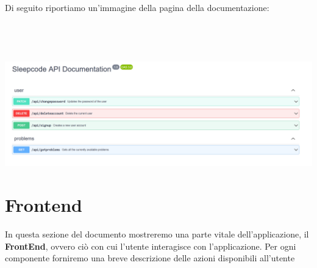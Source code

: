 \documentclass[11pt, a4paper]{article}
\theoremstyle{definition}
\begin{document}
Di seguito riportiamo un'immagine della pagina della documentazione:\\\\
\\\\\
\includegraphics[width=\textwidth]{materiale/API/API-doc.png}

\newpage
\section{Frontend}
In questa sezione del documento mostreremo una parte vitale dell'applicazione, il \textbf{FrontEnd}, ovvero ciò con cui l'utente interagisce con l'applicazione.
Per ogni componente forniremo una breve descrizione delle azioni disponibili all'utente\\\\
\end{document}
